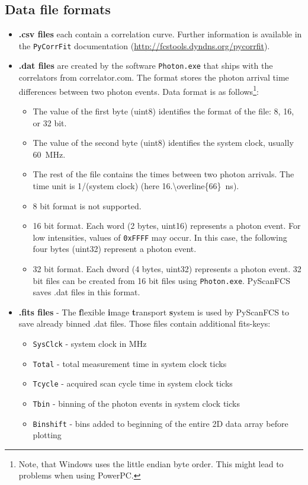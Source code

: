 \subsection{Data file formats}
\begin{itemize}

\item \textbf{\mytilde .csv files} each contain a correlation curve. Further information is available in the \texttt{PyCorrFit} documentation (\url{http://fcstools.dyndns.org/pycorrfit}).

\label{sec:datformat}
\item \textbf{\mytilde .dat files} are created by the software \texttt{Photon.exe} that ships with the correlators from correlator.com. The format stores the photon arrival time differences between two photon events. Data format is as follows\footnote{Note, that Windows uses the little endian byte order. This might lead to problems when using PowerPC.}:
	\begin{itemize}
	\item The value of the first byte (uint8) identifies the format of the file: 8, 16, or 32 bit.
	\item The value of the second byte (uint8) identifies the system clock, usually \SI{60}{MHz}.
	\item The rest of the file contains the times between two photon arrivals. The time unit is 1/(system clock) (here \SI{16.\overline{66}}{ns}).
	\item 8 bit format is not supported.
	\item 16 bit format. Each word (2 bytes, uint16) represents a photon event. For low intensities, values of \texttt{0xFFFF} may occur. In this case, the following four bytes (uint32) represent a photon event.
	\item 32 bit format. Each dword (4 bytes, uint32) represents a photon event. 32 bit files can be created from 16 bit files using \texttt{Photon.exe}. PyScanFCS saves \mytilde .dat files in this format.
 	\end{itemize}
\item \textbf{\mytilde .fits files} - The \textbf{f}lexible \textbf{i}mage \textbf{t}ransport \textbf{s}ystem is used by PyScanFCS to save already binned \mytilde .dat files. Those files contain additional fits-keys:
	\begin{itemize}
	\item \texttt{SysClck} - system clock in MHz
	\item \texttt{Total} - total measurement time in system clock ticks
	\item \texttt{Tcycle} - acquired scan cycle time in system clock ticks
	\item \texttt{Tbin} - binning of the photon events in system clock ticks
	\item \texttt{Binshift} - bins added to beginning of the entire 2D data array before plotting


\end{itemize}
\end{itemize}
